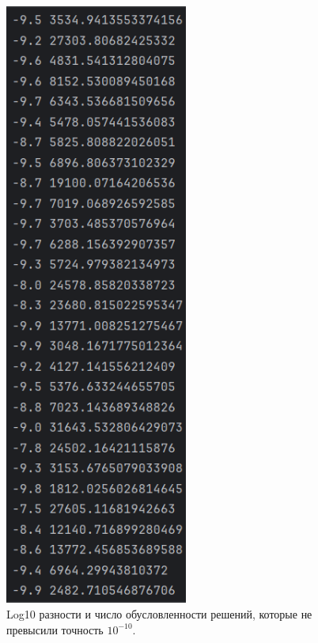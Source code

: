     \begin{figure}[H]
        \centering
        \includegraphics[width=6cm]{pictures/BigConditions.png}
        \caption{Log10 разности и число обусловленности решений, которые не превысили точность $10^{-10}$.}
    \end{figure}